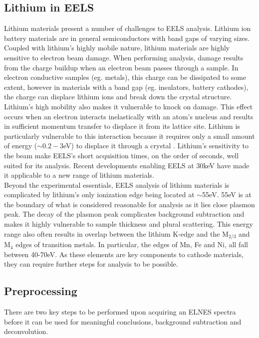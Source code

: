 \subsection{Lithium in EELS}
Lithium materials present a number of challenges to EELS analysis.  Lithium ion battery materials are in general semiconductors with band gaps of varying sizes. Coupled with lithium's highly mobile nature, lithium materials are highly sensitive to electron beam damage.  When performing analysis, damage results from the charge buildup when an electron beam passes through a sample.  In electron conductive samples (eg. metals), this charge can be dissipated to some extent, however in materials with a band gap (eg. insulators, battery cathodes), the charge can displace lithium ions and break down the crystal structure.  Lithium's high mobility also makes it vulnerable to knock on damage.  This effect occurs when an electron interacts inelastically with an atom's nucleus and results in sufficient momentum transfer to displace it from its lattice site.  Lithium is particularly vulnerable to this interaction because it requires only a small amount of energy ($ \sim 0.2-3$eV) to displace it through a crystal \cite{kang_factors_2006}.  Lithium's sensitivity to the beam make EELS's short acquisition times, on the order of seconds, well suited for its analysis. Recent developments enabling EELS at 30keV have made it applicable to a new range of lithium materials.\\  

Beyond the experimental essentials, EELS analysis of lithium materials is complicated by lithium's only ionization edge being located at $\mathrm{\sim}$55eV.  55eV is at the boundary of what is considered reasonable for analysis as it lies close plasmon peak. The decay of the plasmon peak complicates background subtraction and makes it highly vulnerable to sample thickness and plural scattering.  This energy range also often results in overlap between the lithium K-edge and the $\mathrm{M_{2 / 3}}$ and $\mathrm{M_4}$ edges of transition metals. In particular, the edges of Mn, Fe and Ni, all fall between 40-70eV.  As these elements are key components to cathode materials, they can require further steps for analysis to be possible.



\subsection{Preprocessing}

There are two key steps to be performed upon acquiring an ELNES spectra before it can be used for meaningful conclusions, background subtraction and deconvolution. 





